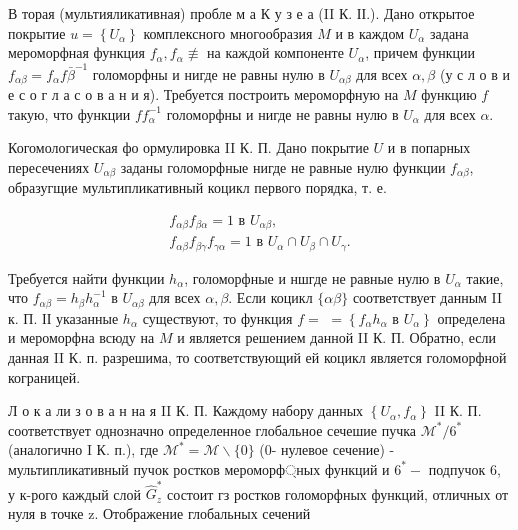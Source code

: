 \documentclass[10pt]{article}
\begin{document}
В торая (мультияликативная) пробле м а К у з е а (II К. ІІ.). Дано открытое покрытие $u=\left\{U_{\alpha}\right\}$ комплексного многообразия $M$ и в каждом $U_{\alpha}$ задана мероморфная функция $f_{\alpha}, f_{\alpha} \not \equiv$ на каждой компоненте $U_{\alpha}$, причем функции $f_{\alpha \beta}=f_{\alpha} f \bar{\beta}^{-1}$ голоморфны и нигде не равны нулю в $U_{\alpha \beta}$ для всех $\alpha, \beta$ (у с л о в и е с о г л а с о в а н и я). Требуется построить мероморфную на $M$ функцию $f$ такую, что функции $f f_{\alpha}^{-1}$ голоморфны и нигде не равны нулю в $U_{\alpha}$ для всех $\alpha$.



Когомологическая фо ормулировка II К. П. Дано покрытие $U$ и в попарных пересечениях $U_{\alpha \beta}$ заданы голоморфные нигде не равные нулю функции $f_{\alpha \beta}$, образугщие мультипликативный коцикл первого порядка, т. е.



\[

\begin{gathered}

f_{\alpha \beta} f_{\beta \alpha}=1 \text { в } U_{\alpha \beta}, \\

f_{\alpha \beta} f_{\beta \gamma} f_{\gamma \alpha}=1 \text { в } U_{\alpha} \cap U_{\beta} \cap U_{\gamma} .

\end{gathered}

\]



Требуется найти функции $h_{\alpha}$, голоморфные и ншгде не равные нулю в $U_{\alpha}$ такие, что $f_{\alpha \beta}=h_{\beta} h_{\alpha}^{-1}$ в $U_{\alpha \beta}$ для всех $\alpha, \beta$. Если коцикл $\{\alpha \beta\}$ соответствует данным II к. П. ІІ указанные $h_{\alpha}$ существуют, то функция $f=$ $=\left\{f_{\alpha} h_{\alpha}\right.$ в $\left.U_{\alpha}\right\}$ определена и мероморфна всюду на $M$ и является решением данной II К. П. Обратно, если данная II К. п. разрешима, то соответствующий ей коцикл является голоморфной кограницей.



Л о к а ли з о в а н на я II К. П. Каждому набору данных $\left\{U_{\alpha}, f_{\alpha}\right\}$ II К. П. соответствует однозначно определенное глобальное сечешие пучка $\mathscr{M}^{*} / 6^{*}$ (аналогично I К. п.), где $\mathscr{M}^{*}=\mathscr{M} \backslash\{0\}$ (0- нулевое сечение) - мультипликативный пучок ростков мероморф্ных функций и $6^{*}-$ подпучок 6, у к-рого каждый слой $\widehat{G}_{z}^{*}$ состоит гз ростков голоморфных функций, отличных от нуля в точке z. Отображение глобальных сечений
\end{document}
